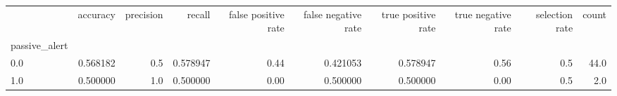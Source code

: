 \begin{tabular}{lrrrrrrrrr}
\toprule
{} &  accuracy &  precision &    recall &  false positive rate &  false negative rate &  true positive rate &  true negative rate &  selection rate &  count \\
passive\_alert &           &            &           &                      &                      &                     &                     &                 &        \\
\midrule
0.0           &  0.568182 &        0.5 &  0.578947 &                 0.44 &             0.421053 &            0.578947 &                0.56 &             0.5 &   44.0 \\
1.0           &  0.500000 &        1.0 &  0.500000 &                 0.00 &             0.500000 &            0.500000 &                0.00 &             0.5 &    2.0 \\
\bottomrule
\end{tabular}
